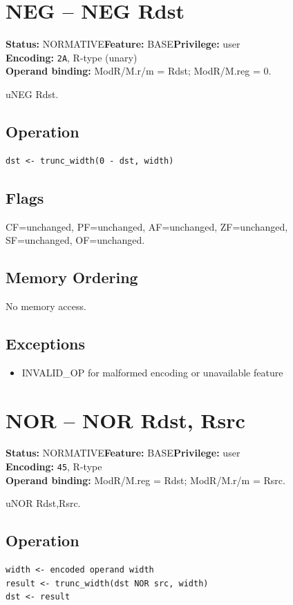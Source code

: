 \documentclass[10pt]{article}
\begin{document}
\section{NEG -- NEG Rdst}
\textbf{Status:} NORMATIVE\quad \textbf{Feature:} BASE\quad \textbf{Privilege:} user\\
\textbf{Encoding:} \texttt{2A}, R-type (unary)\\
\textbf{Operand binding:} ModR/M.r/m = Rdst; ModR/M.reg = 0.

uNEG Rdst.

\subsection*{Operation}
\begin{lstlisting}
dst <- trunc_width(0 - dst, width)
\end{lstlisting}
\subsection*{Flags}
CF=unchanged, PF=unchanged, AF=unchanged, ZF=unchanged, SF=unchanged, OF=unchanged.
\subsection*{Memory Ordering}
No memory access.
\subsection*{Exceptions}
\begin{itemize}
\item INVALID\_OP for malformed encoding or unavailable feature
\end{itemize}
\clearpage

\section{NOR -- NOR Rdst, Rsrc}
\textbf{Status:} NORMATIVE\quad \textbf{Feature:} BASE\quad \textbf{Privilege:} user\\
\textbf{Encoding:} \texttt{45}, R-type\\
\textbf{Operand binding:} ModR/M.reg = Rdst; ModR/M.r/m = Rsrc.

uNOR Rdst,Rsrc.

\subsection*{Operation}
\begin{lstlisting}
width <- encoded operand width
result <- trunc_width(dst NOR src, width)
dst <- result
\end{lstlisting}
\end{document}
